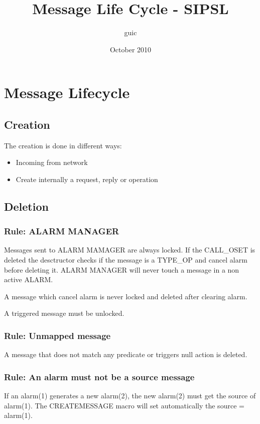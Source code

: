 \documentclass[a4paper]{article}
\title{Message Life Cycle - SIPSL}
\author{guic}
\date{October 2010}
\begin{document}
	\small
	\maketitle
\section{Message Lifecycle}

\subsection{Creation}

The creation is done in different ways:

\begin{itemize}
   \item Incoming from network
   \item Create internally a request, reply or operation
\end{itemize}

\subsection{Deletion}

\subsubsection{Rule: ALARM MANAGER}
 Messages sent to ALARM MAMAGER are always locked. If the CALL\_OSET is deleted the desctructor checks if the message is a TYPE\_OP and cancel alarm before deleting it.
 ALARM MANAGER will never touch a message in a non active ALARM.
 
 A message which cancel alarm is never locked and deleted after clearing alarm.
 
 A triggered message must be unlocked.
 
\subsubsection{Rule: Unmapped message}
 
A message that does not match any predicate or triggers null action is deleted.
 
\subsubsection{Rule: An alarm must not be a source message}
If an alarm(1) generates a new alarm(2), the new alarm(2) must get the source of alarm(1).
The CREATEMESSAGE macro will set automatically the source = alarm(1).
 
\end{document}
